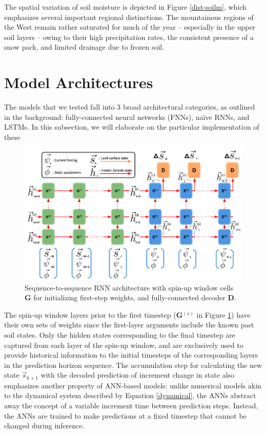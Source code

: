The spatial variation of soil moisture is depicted in Figure \ref{dist-soilm}, which emphasizes several important regional distinctions. The mountainous regions of the West remain rather saturated for much of the year -- especially in the upper soil layers -- owing to their high precipitation rates, the consistent presence of a snow pack, and limited drainage due to frozen soil.

\section{Model Architectures}

The models that we tested fall into 3 broad architectural categories, as outlined in the background: fully-connected neural networks (FNNs), na\"ive RNNs, and LSTMs. In this subsection, we will elaborate on the particular implementation of these

\begin{figure}[h!]
    \centering
    \includegraphics[width=.95\linewidth]{figures/schematic_s2s-default.png}

    \caption{Sequence-to-sequence RNN architecture with spin-up window cells \textbf{G} for initializing first-step weights, and fully-connected decoder \textbf{D}.}
    \label{s2s-default}
\end{figure}

The spin-up window layers prior to the first timestep (\textbf{G}$^{(s)}$ in Figure \ref{s2s-default}) have their own sets of weights since the first-layer arguments include the known past soil states. Only the hidden states corresponding to the final timestep are captured from each layer of the spin-up window, and are exclusively used to provide historical information to the initial timesteps of the corresponding layers in the prediction horizon sequence. The accumulation step for calculating the new state $\vec{s}_{k+1}$ with the decoded prediction of increment change in state also emphasizes another property of ANN-based models: unlike numerical models akin to the dynamical system described by Equation \ref{dynamical}, the ANNs abstract away the concept of a variable increment time between prediction steps. Instead, the ANNs are trained to make predictions at a fixed timestep that cannot be changed during inference.

